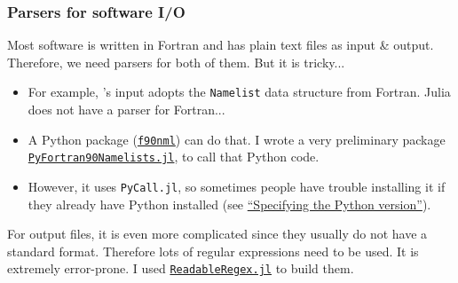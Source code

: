 \subsubsection{Parsers for \ab{} software I/O}

\begin{frame}[allowframebreaks]{\subsubsecname}
    Most \ab{} software is written in Fortran and has plain text files as input \& output.
    Therefore, we need parsers for both of them. But it is tricky...

        {\footnotesize
            \begin{itemize}
                \item For example, \qe{}'s input adopts the \texttt{Namelist} data structure from
                      Fortran. Julia does not have a parser for Fortran...
                \item A Python package
                      (\href{https://github.com/marshallward/f90nml}{\texttt{f90nml}}) can do that.
                      I wrote a very preliminary package
                      \href{https://github.com/singularitti/PyFortran90Namelists.jl}{\texttt{PyFortran90Namelists.jl}},
                      to call that Python code.
                \item However, it uses \texttt{PyCall.jl}, so sometimes people have trouble installing
                      it if they already have Python installed
                      (see \href{https://github.com/JuliaPy/PyCall.jl\#specifying-the-python-version}{``Specifying the Python version''}).
            \end{itemize}
        }

    For output files, it is even more complicated since they usually do not have a standard
    format. Therefore lots of regular expressions need to be used.
    It is extremely error-prone. I used
    \href{https://github.com/jkrumbiegel/ReadableRegex.jl}{\texttt{ReadableRegex.jl}} to build them.
\end{frame}
